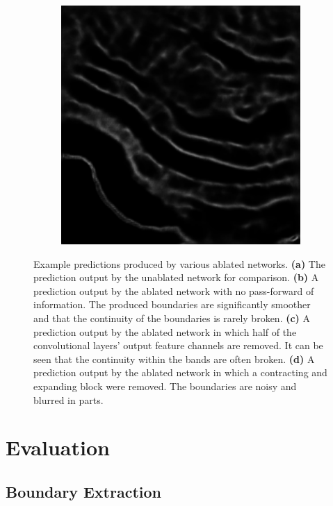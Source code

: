 \begin{figure}[!t]
\begin{subfigure}[t]{0.24\textwidth}
        \caption{}
    \end{subfigure}
    \begin{subfigure}[t]{0.24\textwidth}
        \centering
        \includegraphics[width=1\textwidth, valign=c]{images/abl-half.png}
        \caption{}
    \end{subfigure}
    \caption{Example predictions produced by various ablated networks. \textbf{(a)} The prediction output by the unablated network for comparison. \textbf{(b)} A prediction output by the ablated network with no pass-forward of information. The produced boundaries are significantly smoother and that the continuity of the boundaries is rarely broken. \textbf{(c)} A prediction output by the ablated network in which half of the convolutional layers' output feature channels are removed. It can be seen that the continuity within the bands are often broken. \textbf{(d)} A prediction output by the ablated network in which a contracting and expanding block were removed. The boundaries are noisy and blurred in parts.}
\end{figure}

\section{Evaluation}

\subsection{Boundary Extraction}

